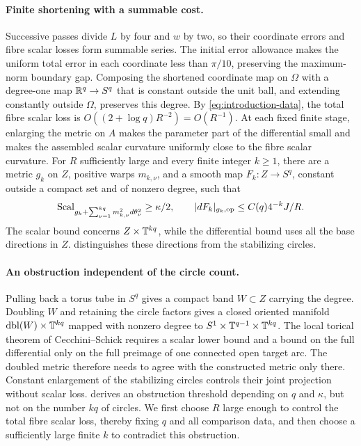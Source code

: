 \paragraph{Finite shortening with a summable cost.}
Successive passes divide $L$ by four and $w$ by two, so their coordinate
errors and fibre scalar losses form summable series. The initial error
allowance makes the uniform total error in each coordinate less than $\pi/10$,
preserving the maximum-norm boundary gap. Composing the shortened coordinate
map on $\Omega$ with a degree-one map $\mathbb R^q\to S^q$ that is constant outside
the unit ball, and extending constantly outside $\Omega$, preserves this
degree. By \eqref{eq:introduction-data},
the total fibre scalar loss is $O((2+\log q)R^{-2})=O(R^{-1})$.
At each fixed finite stage, enlarging
the metric on $A$ makes the parameter part of the differential small and
makes the assembled scalar curvature uniformly close to the fibre scalar
curvature. For $R$ sufficiently large and every finite integer $k\ge1$,
there are a metric $g_k$ on $Z$, positive warps $m_{k,\nu}$, and a smooth map
$F_k:Z\to S^q$, constant outside a compact set and of nonzero degree, such
that
\[
 \operatorname{Scal}_{g_k+\sum_{\nu=1}^{kq}m_{k,\nu}^2d\theta_\nu^2}\ge\kappa/2,
 \qquad
 |dF_k|_{g_k,\mathrm{op}}\le C(q)4^{-k}J/R.
\]
The scalar bound concerns $Z\times\mathbb T^{kq}$, while the differential bound
uses all the base directions in $Z$.
 distinguishes these directions from the
stabilizing circles.



\paragraph{An obstruction independent of the circle count.}
Pulling back a torus tube in $S^q$ gives a compact band $W\subset Z$ carrying
the degree. Doubling $W$ and retaining the circle factors gives a closed
oriented manifold $\operatorname{dbl}(W)\times\mathbb T^{kq}$ mapped with nonzero
degree to $S^1\times\mathbb T^{q-1}\times\mathbb T^{kq}$. The local torical theorem of
Cecchini--Schick requires a
scalar lower bound and a bound on the full differential only on the full
preimage of one connected open target arc. The doubled metric therefore needs
to agree with the constructed metric only there. Constant enlargement of the
stabilizing circles controls their joint projection without scalar loss.
 derives
an obstruction threshold depending on $q$ and $\kappa$, but not on the
number $kq$ of circles. We first choose $R$ large enough to control the total
fibre scalar loss, thereby fixing $q$ and all comparison data, and then choose a
sufficiently large finite $k$ to contradict this obstruction.

